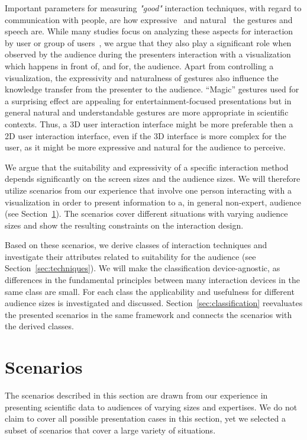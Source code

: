 \documentclass[review,journal]{vgtc}         %
\begin{document}
Important parameters for measuring \emph{"good"} interaction techniques, with regard to communication with people, are how expressive~\cite{Brewster:2009:MIE:2227763.2227769} and natural~\cite{O'hara:2013:NTP:2442106.2442111} the gestures and speech are.
While many studies focus on analyzing these aspects for interaction by user or group of users~\cite{978-3-642-12552-2, Caridakis:2013:NIE:2504335.2504378}, we argue that they also play a significant role when observed by the audience during the presenters interaction with a visualization which happens in front of, and for, the audience.
Apart from controlling a visualization, the expressivity and naturalness of gestures also influence the knowledge transfer from the presenter to the audience. ``Magic'' gestures used for a surprising effect are appealing for entertainment-focused presentations but in general natural and understandable gestures are more appropriate in scientific contexts. 
Thus, a 3D user interaction interface might be more preferable then a 2D user interaction interface, even if the 3D interface is more complex for the user, as it might be more expressive and natural for the audience to perceive.

We argue that the suitability and expressivity of a specific interaction method depends significantly on the screen sizes and the audience sizes.
We will therefore utilize scenarios from our experience that involve one person interacting with a visualization in order to present information to a, in general non-expert, audience (see Section~\ref{sec:scenario}).
The scenarios cover different situations with varying audience sizes and show the resulting constraints on the interaction design.

Based on these scenarios, we derive classes of interaction techniques and investigate their attributes related to suitability for the audience (see Section~\ref{sec:techniques}).
We will make the classification device-agnostic, as differences in the fundamental principles between many interaction devices in the same class are small.
For each class the applicability and usefulness for different audience sizes is investigated and discussed.
Section~\ref{sec:classification} reevaluates the presented scenarios in the same framework and connects the scenarios with the derived classes.

%
%
%
\section{Scenarios} \label{sec:scenario}
The scenarios described in this section are drawn from our experience in presenting scientific data to audiences of varying sizes and expertises.
We do not claim to cover all possible presentation cases in this section, yet we selected a subset of scenarios that cover a large variety of situations.
\end{document}
